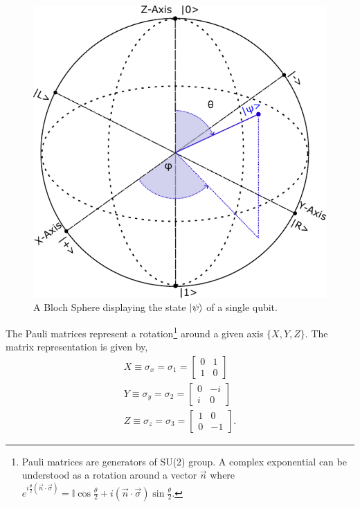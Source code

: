 \begin{figure}[H]
\centering
    \includegraphics[scale=0.8]{Figures/BlochSphere.pdf}
    \caption{A Bloch Sphere displaying the state $\ket{\psi}$ of a single qubit.}
    \label{fig:bloch_sphere}
\end{figure}
The Pauli matrices represent a rotation\footnote{Pauli matrices are generators of SU(2) group. A complex exponential can be understood as a rotation around a vector $\vec{n}$ where $e^{i\frac{\theta}{2}(\vec{n}\cdot \vec{\sigma})} = \mathbb{I}\cos{\frac{\theta}{2}} + i(\vec{n}\cdot \vec{\sigma})\sin{\frac{\theta}{2}}$.} around a given axis $\{X, Y, Z \}$. The matrix representation is given by,
\begin{align*}
X \equiv \sigma_{x} = \sigma_{1} = 
    \begin{bmatrix}
           0 & 1 \\
           1 & 0 
         \end{bmatrix} \\
Y \equiv \sigma_{y} = \sigma_{2} = 
    \begin{bmatrix}
           0 & -i \\
           i & 0 
         \end{bmatrix} \\ 
Z \equiv \sigma_{z} = \sigma_{3} = 
    \begin{bmatrix}
           1 & 0 \\
           0 & -1 
         \end{bmatrix}.
\end{align*}
